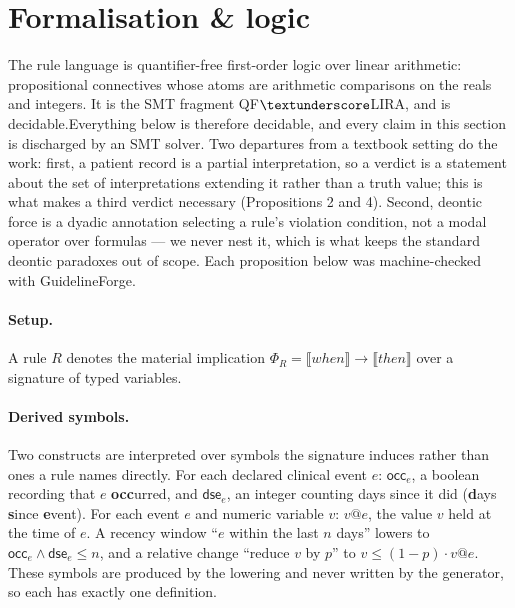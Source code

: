 %
%

\section{Formalisation \& logic}
\label{sec:logic}

The rule language is quantifier-free first-order logic over linear arithmetic: propositional connectives whose atoms are arithmetic comparisons on the reals and integers. It is the SMT fragment QF$\textunderscore$LIRA, and is decidable.Everything below is therefore decidable, and every claim in this section is discharged by an SMT solver. Two departures from a textbook setting do the work: first, a patient record is a partial interpretation, so a verdict is a statement about the set of interpretations extending it rather than a truth value; this is what makes a third verdict necessary (Propositions 2 and 4). Second, deontic force is a dyadic annotation selecting a rule's violation condition, not a modal operator over formulas — we never nest it, which is what keeps the standard deontic paradoxes out of scope. Each proposition below was machine-checked with GuidelineForge. 

\paragraph{Setup.}
A rule $R$ denotes the material implication
$\Phi_R = \llbracket \mathit{when} \rrbracket \rightarrow
          \llbracket \mathit{then} \rrbracket$
over a signature of typed variables.

\paragraph{Derived symbols.}
Two constructs are interpreted over symbols the
signature induces rather than ones a rule names directly. For each declared
clinical event $e$: $\mathsf{occ}_e$, a boolean recording that $e$ \textbf{occ}urred, and
$\mathsf{dse}_e$, an integer counting days since it did (\textbf{d}ays \textbf{s}ince \textbf{e}vent). For each event $e$ and
numeric variable $v$: $v@e$, the value $v$ held at the time of $e$. A recency
window ``$e$ within the last $n$ days'' lowers to
$\mathsf{occ}_e \wedge \mathsf{dse}_e \le n$, and a relative change ``reduce $v$
by $p$'' to $v \le (1-p)\cdot v@e$. These symbols are produced by the lowering
and never written by the generator, so each has exactly one definition.

